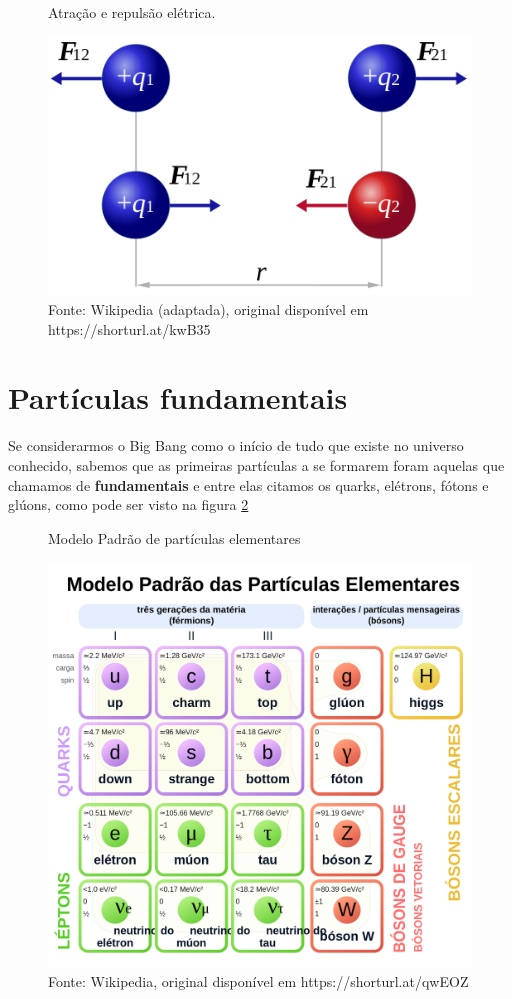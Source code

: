 \documentclass[a4paper,12pt,]{book}
\begin{document}
	\begin{figure}[h]
		\centering
		\caption{Atração e repulsão elétrica.}
		\vspace{0.5cm}
		\includegraphics[width=0.5\linewidth]{imagens/ar2.png}
		\caption*{Fonte: Wikipedia (adaptada), original disponível em https://shorturl.at/kwB35}
	\label{fig:ar}
	\end{figure}

	\section{Partículas fundamentais}
	Se considerarmos o Big Bang como o início de tudo que existe no universo conhecido, sabemos que as primeiras partículas a se formarem foram aquelas que chamamos de \textbf{fundamentais} \cite{griffiths2020introduction} e entre elas citamos os quarks, elétrons, fótons e glúons, como pode ser visto na figura \ref{fig:particulaselementares}

\begin{figure}[H]
	\centering
	\caption{Modelo Padrão de partículas elementares}
	\vspace{0.25cm}
	\label{fig:particulaselementares}
	\includegraphics[width=0.75\linewidth]{imagens/boson2.png}
	\caption*{Fonte: Wikipedia, original disponível em https://shorturl.at/qwEOZ}
\end{figure}
\end{document}
